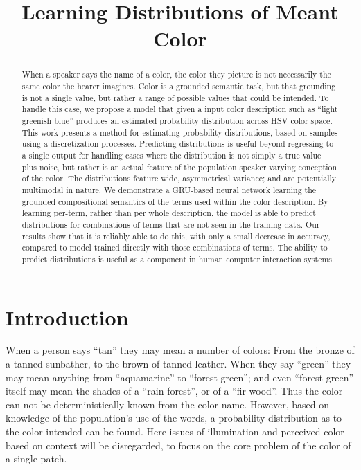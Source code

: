 \documentclass[11pt,letterpaper]{article}
\title{Learning Distributions of Meant Color}
\author{}
\date{}
\begin{document}
\maketitle

\begin{abstract}
When a speaker says the name of a color, the color they picture is not necessarily the same color the hearer imagines.
Color is a grounded semantic task, but that grounding is not a single value, but rather a range of possible values that could be intended.
To handle this case, we propose a model that given a input color description such as ``light greenish blue'' produces an estimated probability distribution across HSV color space.
This work presents a method for estimating probability distributions, based on samples using a discretization processes.
Predicting distributions  is useful beyond regressing to a single output for handling cases where the distribution is not simply a true value plus noise, but rather is an actual feature of the population speaker varying conception of the color.
The distributions feature wide, asymmetrical variance; and are potentially multimodal in nature.
We demonstrate a GRU-based neural network learning the grounded compositional semantics of the terms used within the color description.
By learning per-term, rather than per whole description, the model is able to predict distributions for combinations of terms that are not seen in the training data.
Our results show that it is reliably able to do this,
with only a small decrease in accuracy, compared to model trained directly with those combinations of terms.
The ability to predict distributions is useful as a component in human computer interaction systems.


\end{abstract}

\section{Introduction}
When a person says ``tan'' they may mean a number of colors: From the bronze of a tanned sunbather, to the brown of tanned leather.
When they say ``green'' they may mean anything from ``aquamarine'' to ``forest green'';
 and even ``forest green'' itself may mean the shades of a ``rain-forest'', or of a ``fir-wood''.
Thus the color can not be deterministically known from the color name.
However, based on knowledge of the population's use of the words, a probability distribution as to the color intended can be found.
Here issues of illumination and perceived color based on context will be disregarded, to focus on the core problem of the color of a single patch.
\end{document}
